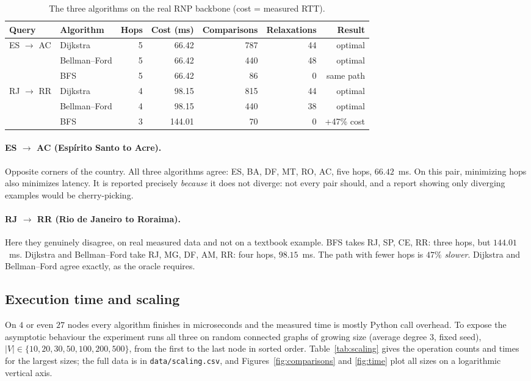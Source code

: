 \documentclass[11pt,a4paper]{article}
\begin{document}
\begin{table}[htbp]
\centering
\begin{tabular}{llrrrrr}
\toprule
Query & Algorithm & Hops & Cost (ms) & Comparisons & Relaxations & Result \\
\midrule
ES $\to$ AC & Dijkstra & 5 & 66.42 & 787 & 44 & optimal \\
 & Bellman--Ford & 5 & 66.42 & 440 & 48 & optimal \\
 & BFS & 5 & 66.42 & 86 & 0 & same path \\
\midrule
RJ $\to$ RR & Dijkstra & 4 & 98.15 & 815 & 44 & optimal \\
 & Bellman--Ford & 4 & 98.15 & 440 & 38 & optimal \\
 & BFS & 3 & 144.01 & 70 & 0 & +47\% cost \\
\bottomrule
\end{tabular}
\caption{The three algorithms on the real RNP backbone (cost = measured RTT).}
\label{tab:rnp}
\end{table}

\paragraph{ES $\to$ AC (Espírito Santo to Acre).} Opposite corners of the country. All three algorithms agree:
ES, BA, DF, MT, RO, AC, five hops, $66.42$~ms. On this pair, minimizing hops also minimizes latency. It is
reported precisely \emph{because} it does not diverge: not every pair should, and a report showing only
diverging examples would be cherry-picking.

\paragraph{RJ $\to$ RR (Rio de Janeiro to Roraima).} Here they genuinely disagree, on real measured data and
not on a textbook example. BFS takes RJ, SP, CE, RR: three hops, but $144.01$~ms. Dijkstra and Bellman--Ford
take RJ, MG, DF, AM, RR: four hops, $98.15$~ms. The path with fewer hops is $47\%$ \emph{slower}. Dijkstra and
Bellman--Ford agree exactly, as the oracle requires.

\subsection{Execution time and scaling}
\label{sec:scaling}

On $4$ or even $27$ nodes every algorithm finishes in microseconds and the measured time is mostly Python call
overhead. To expose the asymptotic behaviour the experiment runs all three on random connected graphs of growing
size (average degree $3$, fixed seed), $|V|\in\{10,20,30,50,100,200,500\}$, from the first to the last node in
sorted order. Table~\ref{tab:scaling} gives the operation counts and times for the largest sizes; the full data
is in \texttt{data/scaling.csv}, and Figures~\ref{fig:comparisons} and \ref{fig:time} plot all sizes on a
logarithmic vertical axis.
\end{document}
